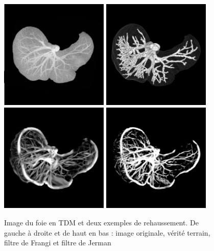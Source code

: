 \begin{figure}
  \centering
  \includegraphics[clip = true, trim  =  10 150 10 150, width=0.46\textwidth]{Images/Ircad_original_volume.png}
  \includegraphics[clip = true, trim  =  10 150 10 150, width=0.46\textwidth]{Images/Ircad_GT.png}
  \\
  \includegraphics[clip = true, trim  =  10 150 10 150, width=0.46\textwidth]{Images/Ircad_Frangi.png}
  \includegraphics[clip = true, trim  =  10 150 10 150, width=0.46\textwidth]{Images/Ircad_Jerman.png}
  \caption{Image du foie en TDM et deux exemples de rehaussement. De gauche à droite et de haut en bas : image originale, vérité terrain, filtre de Frangi et filtre de Jerman}
  \label{fig:enhancement_example}
  \end{figure}

